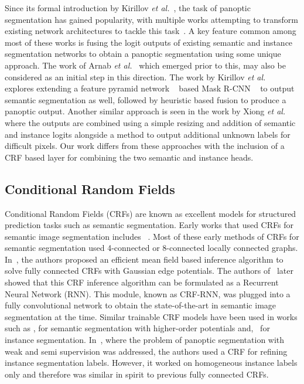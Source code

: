 Since its formal introduction by Kirillov \emph{et al.}~\cite{panoptickirillov2017}, the task of panoptic segmentation has gained popularity, with multiple works attempting to transform existing network architectures to tackle this task~\cite{panoptic_spatial_ranking, panoptic_DeeperLab, panoptic_SSAP, panoptic_attention, panoptic_scene, Upsnet_paper}. A key feature common among most of these works is fusing the logit outputs of existing semantic and instance segmentation networks to obtain a panoptic segmentation using some unique approach. The work of Arnab \emph{et al.}~\cite{Anurag17} which emerged prior to this, may also be considered as an initial step in this direction. The work by Kirillov \emph{et al.}~\cite{panoptics_fpn} explores extending a feature pyramid network ~\cite{FPN_paper} based Mask R-CNN ~\cite{mask_rcnn} to output semantic segmentation as well, followed by heuristic based fusion to produce a panoptic output. Another similar approach is seen in the work by Xiong \emph{et al.}~\cite{Upsnet_paper} where the outputs are combined using a simple resizing and addition of semantic and instance logits alongside a method to output additional unknown labels for difficult pixels. Our work differs from these approaches with the inclusion of a CRF based layer for combining the two semantic and instance heads. 


\subsection{Conditional Random Fields}

Conditional Random Fields (CRFs) are known as excellent models for structured prediction tasks such as semantic segmentation. Early works that used CRFs for semantic image segmentation includes ~\cite{instanceCRF01, instanceCRF02}. Most of these early methods of CRFs for semantic segmentation used 4-connected or 8-connected locally connected graphs. In~\cite{densecrf}, the authors proposed an efficient mean field based inference algorithm to solve fully connected CRFs with Gaussian edge potentials. The authors of~\cite{Zhen_ICCV15_CRFRNN} later showed that this CRF inference algorithm can be formulated as a Recurrent Neural Network (RNN). This module, known as CRF-RNN, was plugged into a fully convolutional network to obtain the state-of-the-art in semantic image segmentation at the time. Similar trainable CRF models have been used in works such as \cite{arnab_eccv_2016}, for semantic segmentation with higher-order potentials and,~\cite{Anurag17} for instance segmentation. In~\cite{li_eccv_2018}, where the problem of panoptic segmentation with weak and semi supervision was addressed, the authors used a CRF for refining instance segmentation labels. However, it worked on homogeneous instance labels only and therefore was similar in spirit to previous fully connected CRFs.

